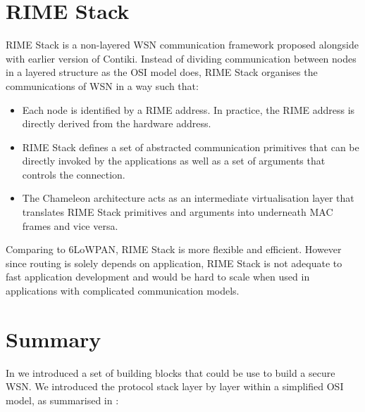 \section{RIME Stack}
RIME Stack\cite{RIME} is a non-layered WSN communication framework proposed alongside with earlier version of Contiki. Instead of dividing communication between nodes in a layered structure as the OSI model does, RIME Stack organises the communications of WSN in a way such that:
\begin{itemize}
	\item Each node is identified by a RIME address. In practice, the RIME address is directly derived from the hardware address.
	\item RIME Stack defines a set of abstracted communication primitives that can be directly invoked by the applications as well as a set of arguments that controls the connection.
	\item The Chameleon architecture\cite{RIME} acts as an intermediate virtualisation layer that translates RIME Stack primitives and arguments into underneath MAC frames and vice versa.
\end{itemize}
Comparing to 6LoWPAN, RIME Stack is more flexible and efficient. However since routing is solely depends on application, RIME Stack is not adequate to fast application development and would be hard to scale when used in applications with complicated communication models.

\section{Summary}
In  we introduced a set of building blocks that could be use to build a secure WSN.  We introduced the protocol stack layer by layer within a simplified OSI model\cite{OSI}, as summarised in :

